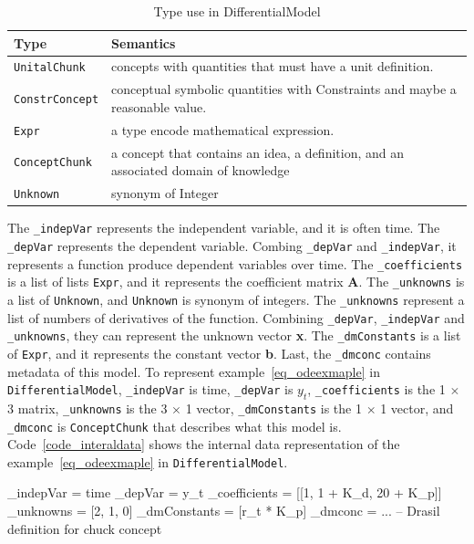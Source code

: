 \begin{table}[ht]
	\begin{tabular}{ p{} p{} }
		\textbf{Type} & \textbf{Semantics} \\
		\toprule
		\verb|UnitalChunk| & concepts with quantities that must have a unit definition.\\
		\verb|ConstrConcept| & conceptual symbolic quantities with Constraints and maybe a reasonable value.\\
		\verb|Expr| & a type encode mathematical expression. \\
		\verb|ConceptChunk| & a concept that contains an idea, a definition, and an associated domain of knowledge\\
        \verb|Unknown|& synonym of Integer\\
		\bottomrule	
	\end{tabular}	
	\caption{Type use in DifferentialModel}	
	\label{tab_demodeltype}
\end{table}

The \verb|_indepVar| represents the independent variable, and it is often time. The \verb|_depVar| represents the dependent variable. Combing \verb|_depVar| and \verb|_indepVar|, it represents a function produce dependent variables over time. The \verb|_coefficients| is a list of lists \verb|Expr|, and it represents the coefficient matrix \textbf{A}. The \verb|_unknowns| is a list of \verb|Unknown|, and \verb|Unknown| is synonym of integers.
The \verb|_unknowns| represent a list of numbers of derivatives of the function. Combining \verb|_depVar|, \verb|_indepVar| and \verb|_unknowns|, they can represent the unknown vector \textbf{x}. The \verb|_dmConstants| is a list of \verb|Expr|, and it represents the constant vector \textbf{b}. Last, the \verb|_dmconc| contains metadata of this model. To represent example~\ref{eq_odeexmaple} in \verb|DifferentialModel|, \verb|_indepVar| is time, \verb|_depVar| is $y_t$, \verb|_coefficients| is the 1 $\times$ 3 matrix, \verb|_unknowns| is the 3 $\times$ 1 vector, \verb|_dmConstants| is the 1 $\times$ 1 vector, and \verb|_dmconc| is \verb|ConceptChunk| that describes what this model is. Code~\ref{code_interaldata} shows the internal data representation of the example~\ref{eq_odeexmaple} in \verb|DifferentialModel|.

\begin{listing}[ht]
\begin{haskell1}
_indepVar = time
_depVar = y_t
_coefficients = [[1, 1 + K_d, 20 + K_p]]
_unknowns = [2, 1, 0]
_dmConstants = [r_t * K_p]
_dmconc = ... -- Drasil definition for chuck concept
\end{haskell1}
\label{code_interaldata}
\end{listing}

